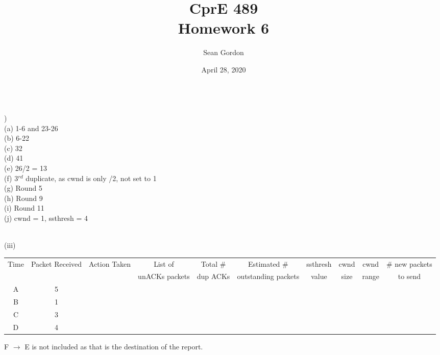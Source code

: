\documentclass[12pt]{article}
\title{CprE 489\\Homework 6}
\author{Sean Gordon}
\date{April 28, 2020}
\begin{document}
\maketitle


\noindent\hrulefill \\


)\\
\indent (a) 1-6 and 23-26\\
\indent (b) 6-22\\
\indent (c) 32\\
\indent (d) 41\\
\indent (e) 26/2 = 13\\
\indent (f) 3$^{rd}$ duplicate, as cwnd is only /2, not set to 1\\
\indent (g) Round 5\\
\indent (h) Round 9\\
\indent (i) Round 11\\
\indent (j) cwnd = 1, ssthresh = 4\\


\noindent\hrulefill \\


\begin{table}[h!]
\centering
\indent (iii)
\begin{tabular}{c|c|c|c|c|c|c|c|c|c}
\bottomrule
\multirow{2}{*}{Time} & \multirow{2}{*}{Packet Received} & \multirow{2}{*}{Action Taken} & List of  & Total \# & Estimated \#  & ssthresh & cwnd & cwnd & \# new packets \\
&&& unACKs packets & dup ACKs & outstanding packets & value & size & range & to send \\\toprule
A & 5 \\
B & 1 \\
C & 3 \\
D & 4 \\\bottomrule
\end{tabular}
\end{table}
\indent \indent F $\rightarrow$ E is not included as that is the destination of the report.
\end{document}
